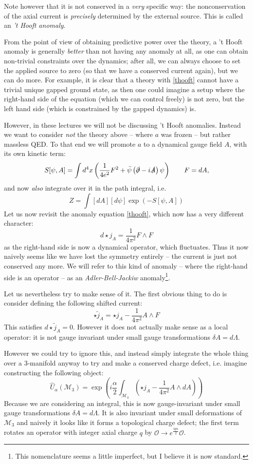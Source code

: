 \documentclass[aps,preprint,nofootinbib,preprintnumbers,eqsecnum,superscriptaddress]{revtex4}
\newcommand{\be}{\begin{equation}}
\newcommand{\ee}{\end{equation}}
\def\le{\left}
\def\ri{\right}
\def\al{{\alpha}}
\newcommand{\p}{\partial}
\newcommand\sM{{\ensuremath{{\mathcal M}}}}
\newcommand\sO{{\ensuremath{{\mathcal O}}}}
\newcommand\bpsi{{\bar \psi}}
\numberwithin{equation}{section}
\begin{document}
Note however that it is not conserved in a {\it very} specific way: the nonconservation of the axial current is {\it precisely} determined by the external source. This is called an {\it 't Hooft anomaly}. 

From the point of view of obtaining predictive power over the theory, a 't Hooft anomaly is generally {\it better} than not having any anomaly at all, as one can obtain non-trivial constraints over the dynamics; after all, we can always choose to set the applied source to zero (so that we have a conserved current again), but we can do more. For example, it is clear that a theory with \eqref{thooft} cannot have a trivial unique gapped ground state, as then one could imagine a setup where the right-hand side of the equation (which we can control freely) is not zero, but the left hand side (which is constrained by the gapped dynamics) is. 

However, in these lectures we will not be discussing 't Hooft anomalies. Instead we want to consider {\it not} the theory above -- where $a$ was frozen -- but rather massless QED. To that end we will promote $a$ to a dynamical gauge field $A$, with its own kinetic term: 
\be
S[\psi,A] = \int d^4x \le(\frac{1}{4 e^2} F^2 + \bpsi \le(\slashed{\p} - i \slashed{A}\ri) \psi\ri) \qquad F = dA,
\ee
and now {\it also} integrate over it in the path integral, i.e.
\be
Z = \int [dA] [d\psi] \exp(-S[\psi,A])
\ee
Let us now revisit the anomaly equation \eqref{thooft}, which now has a very different character:
\be
d \star j_{A} = \frac{1}{4\pi^2} F \wedge F
\ee
as the right-hand side is now a dynamical operator, which fluctuates. Thus it now naively seems like we have lost the symmetry entirely -- the current is just not conserved any more. We will refer to this kind of anomaly -- where the right-hand side is an operator -- as an {\it Adler-Bell-Jackiw} anomaly\footnote{This  nomenclature seems a little imperfect, but I believe it is now standard.}. 

Let us nevertheless try to make sense of it. The first obvious thing to do is consider defining the following shifted current:
\be
\star \tilde{j}_A = \star j_{A} - \frac{1}{4\pi^2} A \wedge F
\ee
This satisfies $d\star \tilde{j}_A = 0$. However it does not actually make sense as a local operator: it is not gauge invariant under small gauge transformations $\delta A = d\Lambda$. 

However we could try to ignore this, and instead simply integrate the whole thing over a 3-manifold anyway to try and make a conserved charge defect, i.e. imagine constructing the following object:
\be
\hat{U}_{\al}(\sM_3) = \exp\le(i\frac{\al}{2} \int_{\sM_3} \le(\star j_{A} - \frac{1}{4\pi^2} A \wedge dA\ri)\ri) \label{illdef} 
\ee
Because we are considering an integral, this is now gauge-invariant under small gauge transformations $\delta A = d\Lambda$. It is also invariant under small deformations of $\sM_3$ and naively it looks like it forms a topological charge defect; the first term rotates an operator with integer axial charge $q$ by $\sO \to e^{\frac{i q \al}{2}}\sO$.
\end{document}

